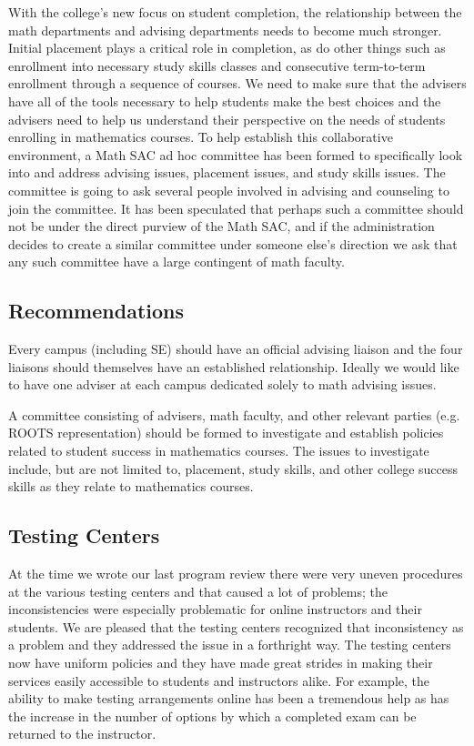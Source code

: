 With the college's new focus on student completion, the relationship between the math departments and advising departments needs to become much stronger.  Initial placement plays a critical role in completion, as do other things such as enrollment into necessary study skills classes and consecutive term-to-term enrollment through a sequence of courses.  We need to make sure that the advisers have all of the tools necessary to help students make the best choices and the advisers need to help us understand their perspective on the needs of students enrolling in mathematics courses.  To help establish this collaborative environment, a Math SAC ad hoc committee has been formed to specifically look into and address advising issues, placement issues, and study skills issues.  The committee is going to ask several people involved in advising and counseling to join the committee.  It has been speculated that perhaps such a committee should not be under the direct purview of the Math SAC, and if the administration decides to create a similar committee under someone else's direction we ask that any such committee have a large contingent of math faculty.

\subsection{Recommendations}
Every campus (including SE)  should have an official advising liaison and the four liaisons should themselves have an established relationship.  Ideally we would like to have one adviser at each campus dedicated solely to math advising issues.

A committee consisting of advisers, math faculty, and other relevant parties (e.g. ROOTS representation) should be formed to investigate and establish policies related to student success in mathematics courses.  The issues to investigate include, but are not limited to,  placement, study skills, and other college success skills as they relate to mathematics courses.

\subsection{Testing Centers}
At the time we wrote our last program review there were very uneven procedures at the various testing centers and that caused a lot of problems; the inconsistencies were especially problematic for online instructors and their students.  We are pleased that the testing centers recognized that inconsistency as a problem and they addressed the issue in a forthright way.  The testing centers now have uniform policies and they have made great strides in making their services easily accessible to students and instructors alike.   For example, the ability to make testing arrangements online has been a tremendous help as has the increase in the number of options by which a completed exam can be returned to the instructor.

